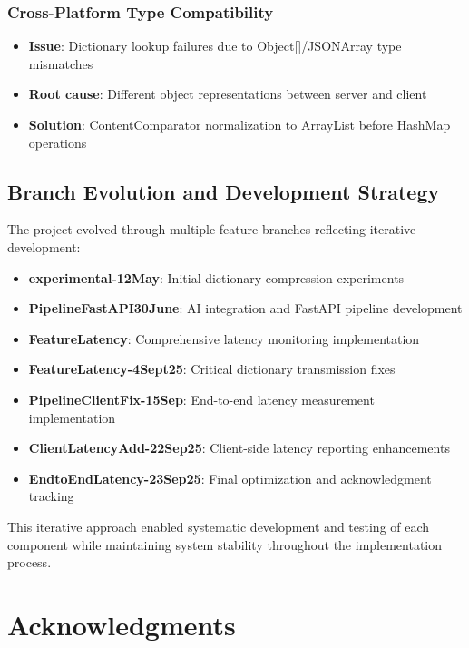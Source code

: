 \documentclass[12pt,a4paper]{article}
\begin{document}
\subsubsection{Cross-Platform Type Compatibility}
\begin{itemize}
    \item \textbf{Issue}: Dictionary lookup failures due to Object[]/JSONArray type mismatches
    \item \textbf{Root cause}: Different object representations between server and client
    \item \textbf{Solution}: ContentComparator normalization to ArrayList before HashMap operations
\end{itemize}

\subsection{Branch Evolution and Development Strategy}

The project evolved through multiple feature branches reflecting iterative development:

\begin{itemize}
    \item \textbf{experimental-12May}: Initial dictionary compression experiments
    \item \textbf{PipelineFastAPI30June}: AI integration and FastAPI pipeline development  
    \item \textbf{FeatureLatency}: Comprehensive latency monitoring implementation
    \item \textbf{FeatureLatency-4Sept25}: Critical dictionary transmission fixes
    \item \textbf{PipelineClientFix-15Sep}: End-to-end latency measurement implementation
    \item \textbf{ClientLatencyAdd-22Sep25}: Client-side latency reporting enhancements
    \item \textbf{EndtoEndLatency-23Sep25}: Final optimization and acknowledgment tracking
\end{itemize}

This iterative approach enabled systematic development and testing of each component while maintaining system stability throughout the implementation process.

\section{Acknowledgments}
\end{document}
